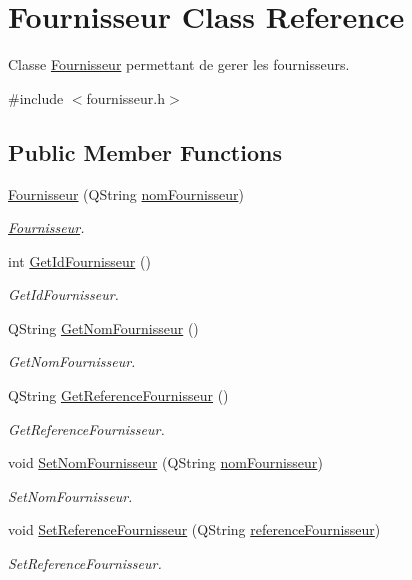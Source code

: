 \hypertarget{class_fournisseur}{}\section{Fournisseur Class Reference}
\label{class_fournisseur}


Classe \mbox{\hyperlink{class_fournisseur}{Fournisseur}} permettant de gerer les fournisseurs.  




{\ttfamily \#include $<$fournisseur.\+h$>$}

\subsection*{Public Member Functions}
\begin{DoxyCompactItemize}
\item 
\mbox{\hyperlink{class_fournisseur_a81aa41d5b1039e9816da11048e1970f4}{Fournisseur}} (Q\+String \mbox{\hyperlink{class_fournisseur_a720c9ecc464a5dd2b999df1bcd70c95f}{nom\+Fournisseur}})
\begin{DoxyCompactList}\small\item\em \mbox{\hyperlink{class_fournisseur}{Fournisseur}}. \end{DoxyCompactList}\item 
int \mbox{\hyperlink{class_fournisseur_a72630517bf1b71ffd938bf774f223a56}{Get\+Id\+Fournisseur}} ()
\begin{DoxyCompactList}\small\item\em Get\+Id\+Fournisseur. \end{DoxyCompactList}\item 
Q\+String \mbox{\hyperlink{class_fournisseur_aead937b32a22c0a46b3e15afb44333e3}{Get\+Nom\+Fournisseur}} ()
\begin{DoxyCompactList}\small\item\em Get\+Nom\+Fournisseur. \end{DoxyCompactList}\item 
Q\+String \mbox{\hyperlink{class_fournisseur_a44f6572c550378be4aa21302be6bc58a}{Get\+Reference\+Fournisseur}} ()
\begin{DoxyCompactList}\small\item\em Get\+Reference\+Fournisseur. \end{DoxyCompactList}\item 
void \mbox{\hyperlink{class_fournisseur_af4b9f8709e2395729b9853a78f6db4fb}{Set\+Nom\+Fournisseur}} (Q\+String \mbox{\hyperlink{class_fournisseur_a720c9ecc464a5dd2b999df1bcd70c95f}{nom\+Fournisseur}})
\begin{DoxyCompactList}\small\item\em Set\+Nom\+Fournisseur. \end{DoxyCompactList}\item 
void \mbox{\hyperlink{class_fournisseur_aa0f5a8e72e7394e4d5f886b8ddbab33b}{Set\+Reference\+Fournisseur}} (Q\+String \mbox{\hyperlink{class_fournisseur_a3f6d46842ec2ce1879db25254cc7728d}{reference\+Fournisseur}})
\begin{DoxyCompactList}\small\item\em Set\+Reference\+Fournisseur. \end{DoxyCompactList}\end{DoxyCompactItemize}
